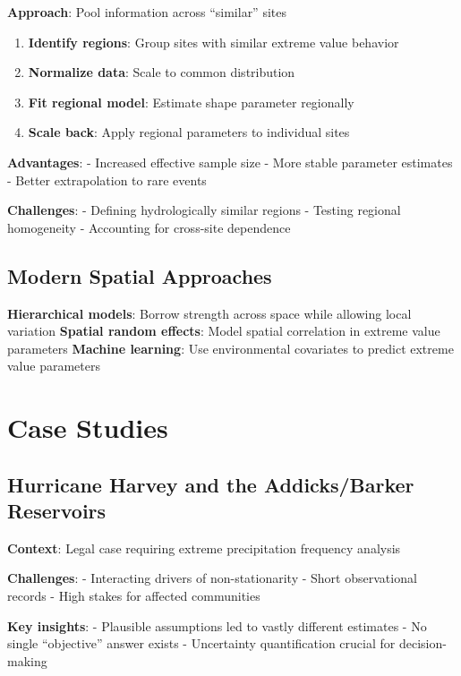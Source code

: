 \documentclass[
  letterpaper,
  DIV=11,
  numbers=noendperiod]{scrreprt}
\providecommand{\tightlist}{%
  \setlength{\itemsep}{0pt}\setlength{\parskip}{0pt}}
\begin{document}
\textbf{Approach}: Pool information across ``similar'' sites

\begin{enumerate}
\def\labelenumi{\arabic{enumi}.}
\tightlist
\item
  \textbf{Identify regions}: Group sites with similar extreme value
  behavior
\item
  \textbf{Normalize data}: Scale to common distribution
\item
  \textbf{Fit regional model}: Estimate shape parameter regionally
\item
  \textbf{Scale back}: Apply regional parameters to individual sites
\end{enumerate}

\textbf{Advantages}: - Increased effective sample size - More stable
parameter estimates - Better extrapolation to rare events

\textbf{Challenges}: - Defining hydrologically similar regions - Testing
regional homogeneity - Accounting for cross-site dependence

\subsection{Modern Spatial Approaches}\label{modern-spatial-approaches}

\textbf{Hierarchical models}: Borrow strength across space while
allowing local variation \textbf{Spatial random effects}: Model spatial
correlation in extreme value parameters \textbf{Machine learning}: Use
environmental covariates to predict extreme value parameters

\section{Case Studies}\label{case-studies}

\subsection{Hurricane Harvey and the Addicks/Barker
Reservoirs}\label{hurricane-harvey-and-the-addicksbarker-reservoirs}

\textbf{Context}: Legal case requiring extreme precipitation frequency
analysis

\textbf{Challenges}: - Interacting drivers of non-stationarity - Short
observational records - High stakes for affected communities

\textbf{Key insights}: - Plausible assumptions led to vastly different
estimates - No single ``objective'' answer exists - Uncertainty
quantification crucial for decision-making
\end{document}
